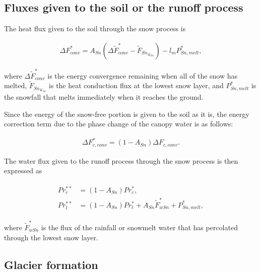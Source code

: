 \hypertarget{fluxes-given-to-the-soil-or-the-runoff-process}{%
\subsection{Fluxes given to the soil or the runoff process}\label{fluxes-given-to-the-soil-or-the-runoff-process}}

The heat flux given to the soil through the snow process is

\begin{eqnarray}
\Delta F_{conv}^{\ast}
 = A_{Sn} (\Delta\widetilde{F}_{conv}^{\ast} - \widetilde{F}_{Sn_{K_{Sn}}}) - l_m P_{Sn,melt}^{\ast},
\label{8-43}
\end{eqnarray}

where \(\Delta\widetilde{F}_{conv}^{\ast}\) is the energy convergence remaining when all of the snow has melted, \(\widetilde{F}_{Sn_{K_{Sn}}}\) is the heat conduction flux at the lowest snow layer,
and \(P_{Sn,melt}^{\ast}\) is the snowfall that melts immediately when it reaches the ground.

Since the energy of the snow-free portion is given to the soil as it is, the energy correction term due to the phase change of the canopy water is as follows:

\begin{eqnarray}
 \Delta F_{c,conv}^{\ast} = (1 - A_{Sn}) \Delta F_{c,conv}. \label{8-44}
\end{eqnarray}

The water flux given to the runoff process through the snow process is then expressed as

\begin{eqnarray}
\begin{aligned}
 Pr_c^{\ast\ast} &= ( 1 - A_{Sn} ) Pr_c^{\ast}, \\
 Pr_l^{\ast\ast} &= ( 1 - A_{Sn} ) Pr_l^{\ast} + A_{Sn} \widetilde{F}_{wSn}^{\ast} + P_{Sn,melt}^{\ast},
\end{aligned} \label{8-45}
\end{eqnarray}

where \(\widetilde{F}_{wSn}^{\ast}\) is the flux of the rainfall or snowmelt water that has percolated through the lowest snow layer.

\hypertarget{glacier-formation}{%
\subsection{Glacier formation}\label{glacier-formation}}


